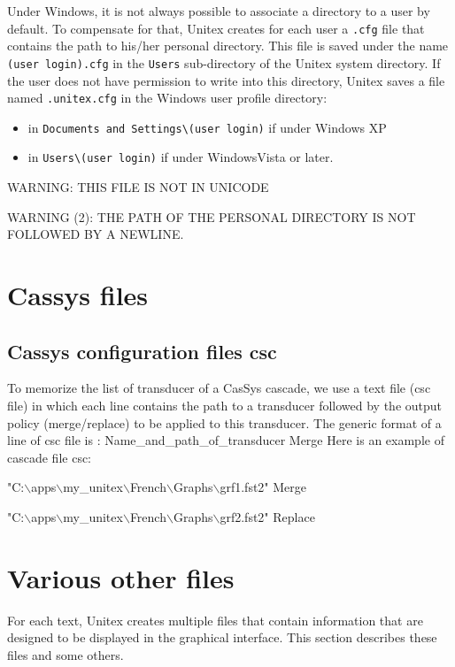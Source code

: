 \bigskip
\noindent Under Windows, it is not always possible to associate a directory to a user by
default. To compensate for that, Unitex creates for each user a \verb+.cfg+ file
that contains the path to his/her personal directory. This file is saved under the
name \verb+(user login).cfg+ in the \verb+Users+ sub-directory of the Unitex system directory.
If the user does not have permission to write into this directory, Unitex saves a file named \verb+.unitex.cfg+
 in the Windows user profile directory:
\begin{itemize}
\item in \verb+Documents and Settings\(user login)+ if under Windows XP
\item in \verb+Users\(user login)+ if under WindowsVista or later.
\end{itemize}

\bigskip
\noindent WARNING:  THIS FILE IS NOT IN UNICODE

\bigskip
\noindent WARNING (2): THE PATH OF THE PERSONAL
DIRECTORY IS NOT FOLLOWED BY A NEWLINE.

\section{Cassys files}

\subsection{Cassys configuration files csc}

To memorize the list of transducer of a CasSys cascade, we use a text file (csc file) in which each line contains the path to a transducer followed by the output policy (merge/replace) to be applied to this transducer.
The generic format of a line of csc file is : Name\_and\_path\_of\_transducer  Merge
Here is an example of cascade file csc:

\ttfamily
"C:$\backslash$apps$\backslash$my\_unitex$\backslash$French$\backslash$Graphs$\backslash$grf1.fst2" Merge

"C:$\backslash$apps$\backslash$my\_unitex$\backslash$French$\backslash$Graphs$\backslash$grf2.fst2" Replace
\rmfamily

\section{Various other files}
For each text, Unitex creates multiple files that contain information that are
designed to be displayed in the graphical interface. This section describes these
files and some others.


